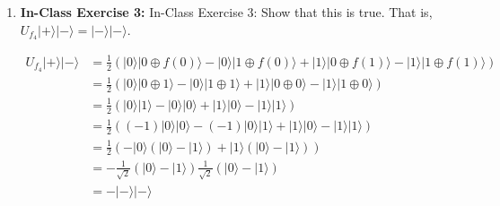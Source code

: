 \documentclass[main.tex]{subfiles}
\begin{document}
\begin{enumerate}
\item[] \textbf{In-Class Exercise 3:} In-Class Exercise 3: Show that this is true. That is, $U_{f_{4}}|+\rangle|-\rangle=|-\rangle|-\rangle$.

    \begin{align*}
    U_{f_{4}}|+\rangle|-\rangle &=\frac{1}{2}(|0\rangle|0 \oplus f(0)\rangle-|0\rangle|1 \oplus f(0)\rangle
                                +|1\rangle|0 \oplus f(1)\rangle-|1\rangle|1 \oplus f(1)\rangle) \\
                                &=\frac{1}{2}(|0\rangle|0 \oplus 1\rangle-|0\rangle|1 \oplus 1\rangle
                                +|1\rangle|0 \oplus 0\rangle-|1\rangle|1 \oplus 0\rangle) \\
                                &=\frac{1}{2}(|0\rangle|1\rangle-|0\rangle|0\rangle
                                +|1\rangle|0\rangle-|1\rangle|1\rangle) \\
                                &=\frac{1}{2}((-1)|0\rangle|0\rangle-(-1)|0\rangle|1\rangle
                                +|1\rangle|0\rangle-|1\rangle|1\rangle) \\
                                &=\frac{1}{2}(-|0\rangle(|0\rangle-|1\rangle)
                                +|1\rangle(|0\rangle-|1\rangle)) \\
                                &=-\frac{1}{\sqrt{2}}(|0\rangle-|1\rangle) \frac{1}{\sqrt{2}}(|0\rangle-|1\rangle) \\
                                &=-|-\rangle|-\rangle \tag{cannot remove -}
    \end{align*}

\end{enumerate}
\end{document}
